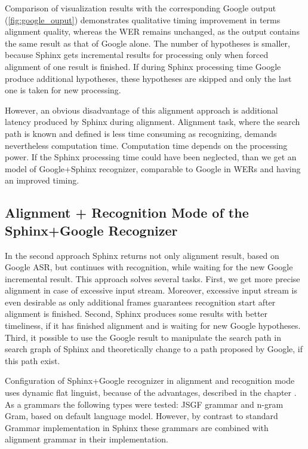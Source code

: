 Comparison of visualization results with the corresponding Google
output (\ref{fig:google_ouput}) demonstrates qualitative timing improvement in terms
alignment quality, whereas the WER remains unchanged, as the output contains
the same result as that of Google alone. The number of hypotheses is smaller,
because Sphinx gets incremental results for processing only when
forced alignment of one result is finished.  If during Sphinx processing time
Google produce additional hypotheses, these hypotheses are skipped and only the
last one is taken for new processing. 

However, an obvious disadvantage of this alignment approach is additional
latency produced by Sphinx during alignment.
Alignment task, where the search path is known and defined is less time
consuming as recognizing, demands nevertheless computation time.  Computation
time depends on the processing power. If the Sphinx processing time could have
been neglected, than we get an model of Google+Sphinx recognizer,
comparable to Google in WERs and having an improved timing.

\subsection {Alignment + Recognition Mode  of the Sphinx+Google Recognizer}

In the second approach Sphinx returns not only alignment result, based on Google
ASR, but continues with recognition, while waiting for the new Google incremental result. 
This approach solves several tasks. First, we get more precise alignment  in
case of excessive input stream. Moreover, excessive input stream is
even desirable as only additional frames guarantees recognition start after
alignment is finished. Second, Sphinx produces some results with better
timeliness, if it has finished alignment and is waiting for new Google
hypotheses. Third, it possible to use the Google result to manipulate the search
path in search graph of Sphinx and theoretically change to a path proposed by
Google, if this path exist. 

Configuration of Sphinx+Google recognizer in alignment and recognition mode
uses dynamic flat linguist, because of the  advantages, described in the chapter
\label{ref:sphinx}. As a grammars the following types were tested: JSGF grammar
and n-gram Gram, based on default language model.  However, by contrast to standard Grammar
implementation in Sphinx these grammars are combined with alignment grammar in
their implementation.


